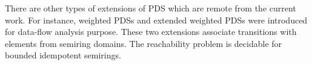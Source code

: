 

There are other types of extensions of PDS which are remote from the current work. For instance, weighted PDSs and extended weighted PDSs were introduced  \cite{RepsSJM05, LalRB05} for data-flow analysis purpose. These two extensions associate transitions with elements from semiring domains. The reachability problem is decidable for bounded idempotent semirings. 





 



 




